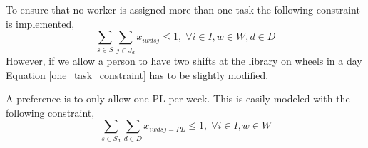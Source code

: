 To ensure that no worker is assigned more than one task the following constraint is implemented,
\begin{equation} \label{one_task_constraint}
\sum_{s\in S}\sum_{j\in J_d} x_{iwdsj} \leq 1, \; \forall i\in I, w \in W, d\in D
\end{equation}
However, if we allow a person to have two shifts at the library on wheels in a day Equation \ref{one_task_constraint} has to be slightly modified.

A preference is to only allow one PL per week. This is easily modeled with the following constraint,
\begin{equation} 
\sum_{s \in S_d}\sum_{d \in D} x_{iwdsj=PL} \leq 1, \; \forall i\in I, w \in W
\end{equation}
